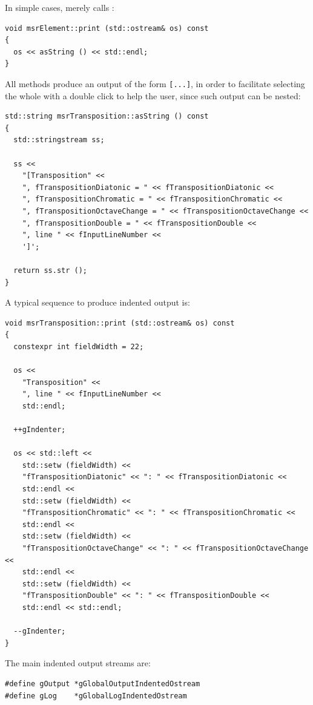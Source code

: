 In simple cases,  merely calls :
\begin{lstlisting}[language=CPlusPlus]
void msrElement::print (std::ostream& os) const
{
  os << asString () << std::endl;
}
\end{lstlisting}

All  methods produce an output of the form {\tt [...]}, in order to facilitate selecting the whole with a double click to help the user, since such output can be nested:
\begin{lstlisting}[language=CPlusPlus]
std::string msrTransposition::asString () const
{
  std::stringstream ss;

  ss <<
    "[Transposition" <<
    ", fTranspositionDiatonic = " << fTranspositionDiatonic <<
    ", fTranspositionChromatic = " << fTranspositionChromatic <<
    ", fTranspositionOctaveChange = " << fTranspositionOctaveChange <<
    ", fTranspositionDouble = " << fTranspositionDouble <<
    ", line " << fInputLineNumber <<
    ']';

  return ss.str ();
}
\end{lstlisting}

A typical sequence to produce indented output is:
\begin{lstlisting}[language=CPlusPlus]
void msrTransposition::print (std::ostream& os) const
{
  constexpr int fieldWidth = 22;

  os <<
    "Transposition" <<
    ", line " << fInputLineNumber <<
    std::endl;

  ++gIndenter;

  os << std::left <<
    std::setw (fieldWidth) <<
    "fTranspositionDiatonic" << ": " << fTranspositionDiatonic <<
    std::endl <<
    std::setw (fieldWidth) <<
    "fTranspositionChromatic" << ": " << fTranspositionChromatic <<
    std::endl <<
    std::setw (fieldWidth) <<
    "fTranspositionOctaveChange" << ": " << fTranspositionOctaveChange <<
    std::endl <<
    std::setw (fieldWidth) <<
    "fTranspositionDouble" << ": " << fTranspositionDouble <<
    std::endl << std::endl;

  --gIndenter;
}
\end{lstlisting}

The main indented output streams are:
\begin{lstlisting}[language=CPlusPlus]
#define gOutput *gGlobalOutputIndentedOstream
#define gLog    *gGlobalLogIndentedOstream

\end{lstlisting}


